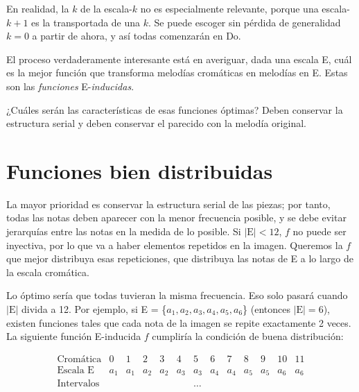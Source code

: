 		
		En realidad, la $k$ de la escala-$k$ no es especialmente relevante, porque una escala-$k+1$ es la transportada de una $k$. Se puede escoger sin pérdida de generalidad $k=0$ a partir de ahora, y así todas comenzarán en Do.
		
		El proceso verdaderamente interesante está en averiguar, dada una escala E, cuál es la mejor función que transforma melodías cromáticas en melodías en E. Estas son las \textit{funciones} E-\textit{inducidas}.
		
		¿Cuáles serán las características de esas funciones óptimas? Deben conservar la estructura serial y deben conservar el parecido con la melodía original.
		
	\section{Funciones bien distribuidas}
		
		La mayor prioridad es conservar la estructura serial de las piezas; por tanto, todas las notas deben aparecer con la menor frecuencia posible, y se debe evitar jerarquías entre las notas en la medida de lo posible. Si $|\text{E}|<12$, $f$ no puede ser inyectiva, por lo que va a haber elementos repetidos en la imagen. Queremos la $f$ que mejor distribuya esas repeticiones, que distribuya las notas de E a lo largo de la escala cromática.
		
		Lo óptimo sería que todas tuvieran la misma frecuencia. Eso solo pasará cuando $|\text{E}|$ divida a 12. Por ejemplo, si E = \{$a_1,a_2,a_3,a_4,a_5,a_6$\} (entonces $|\text{E}|=6$), existen funciones tales que cada nota de la imagen se repite exactamente 2 veces. La siguiente función E-inducida $f$ cumpliría la condición de buena distribución:
				
		\[\left.\begin{matrix}
		\text{Cromática}&0&1&2&3&4&5&6&7&8&9&10&11\\
		\text{Escala E}&a_1&a_1&a_2&a_2&a_3&a_3&a_4&a_4&a_5&a_5&a_6&a_6\\
		\text{Intervalos}&&&&&&\ldots\\
		\end{matrix}\right.\]
		
